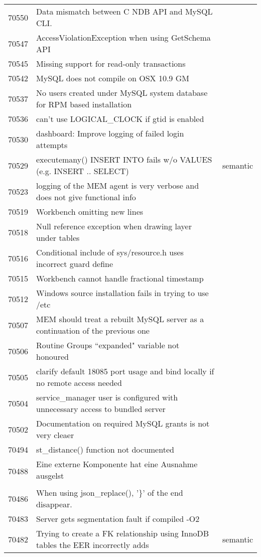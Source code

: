 \begin{longtable}[c]{p{1cm}p{8cm}p{3cm}}
70550 & Data mismatch between C NDB API and MySQL CLI. &  \\
70547 & AccessViolationException when using GetSchema API &  \\
70545 & Missing support for read-only transactions &  \\
70542 & MySQL does not compile on OSX 10.9 GM &  \\
70537 & No users created under MySQL system database for RPM based installation &  \\
70536 & can't use LOGICAL\_CLOCK if gtid is enabled &  \\
70530 & dashboard: Improve logging of failed login attempts &  \\
70529 & executemany() INSERT INTO fails w/o VALUES (e.g. INSERT .. SELECT) & semantic \\
70523 & logging of the MEM agent is very verbose and does not give functional info &  \\
70519 & Workbench omitting new lines &  \\
70518 & Null reference exception when drawing layer under tables &  \\
70516 & Conditional include of sys/resource.h uses incorrect guard define &  \\
70515 & Workbench cannot handle fractional timestamp &  \\
70512 & Windows source installation fails in trying to use /etc &  \\
70507 & MEM should treat a rebuilt MySQL server as a continuation of the previous one &  \\
70506 & Routine Groups ``expanded" variable not honoured &  \\
70505 & clarify default 18085 port usage and bind locally if no remote access needed &  \\
70504 & service\_manager user is configured with unnecessary access to bundled server &  \\
70502 & Documentation on required MySQL grants is not very cleaer &  \\
70494 & st\_distance() function not documented &  \\
70488 & Eine externe Komponente hat eine Ausnahme ausgelst &  \\
70486 & When using json\_replace(), '\}' of the end disappear. &  \\
70483 & Server gets segmentation fault if compiled -O2 &  \\
70482 & Trying to create a FK relationship using InnoDB tables the EER incorrectly adds & semantic \\

\end{longtable}
